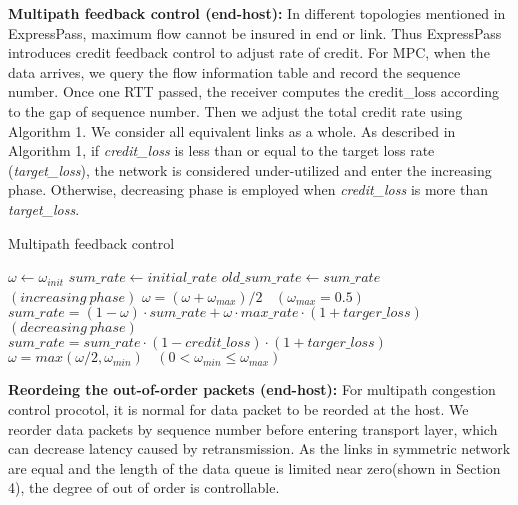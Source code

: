 \documentclass[conference,compsoc]{IEEEtran}
\begin{document}
\textbf{Multipath feedback control (end-host):} In different topologies mentioned in ExpressPass, maximum flow cannot be insured in end or link. Thus ExpressPass introduces credit feedback control to adjust rate of credit. For MPC, when the data arrives, we query the flow information table and record the sequence number. Once one RTT passed, the receiver computes the credit\_loss according to the gap of sequence number. Then we adjust the total credit rate using Algorithm 1. We consider all equivalent links as a whole. As described in Algorithm 1, if \emph{credit\_loss} is less than or equal to the target loss rate (\emph{target\_loss}), the network is considered under-utilized and enter the increasing phase. Otherwise, decreasing phase is employed when \emph{credit\_loss} is more than \emph{target\_loss}.
\begin{algorithm}
\caption{Multipath feedback control}
\label{alg:A}
\begin{algorithmic}
\STATE ${\omega \gets \omega_{init}}$
\STATE $sum\_rate \gets initial\_rate$
\REPEAT {}
\STATE $old\_sum\_rate \gets sum\_rate$
\STATE $(increasing\ phase)$
\STATE ${\omega = (\omega + \omega_{max})/2}\ \ \ \ (\omega_{max}=0.5)$
\STATE $sum\_rate=(1-\omega) \cdot sum\_rate + \omega \cdot max\_rate \cdot (1+targer\_loss)$
\ENDIF
\ELSE
\STATE $(decreasing\ phase)$
\STATE $sum\_rate=sum\_rate \cdot (1-credit\_loss) \cdot (1+targer\_loss)$
\STATE ${\omega = max(\omega /2 , \omega_{min})}\ \ \ \ (0< \omega_{min} \le \omega_{max})$
\ENDIF
{}
\end{algorithmic}
\end{algorithm}

\textbf{Reordeing the out-of-order packets (end-host):} For multipath congestion control procotol, it is normal for data packet to be reorded at the host. We reorder data packets by sequence number before entering transport layer, which can decrease latency caused by retransmission. As the links in symmetric network are equal and the length of the data queue is limited near zero(shown in Section 4), the degree of out of order is controllable.
\end{document}

